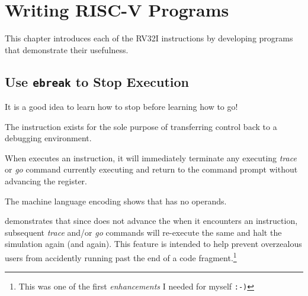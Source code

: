 \chapter{Writing RISC-V Programs}

%
This chapter introduces each of the RV32I instructions by developing programs 
that demonstrate their usefulness.


\section{Use {\tt ebreak} to Stop \rvddt{} Execution}
\label{insn:ebreak}

It is a good idea to learn how to stop before learning how to go!

The  instruction exists for the sole purpose of transferring control back 
to a debugging environment.\cite[p.~24]{rvismv1v22:2017}

When \rvddt{} executes an  instruction, it will immediately terminate any
executing {\em trace} or {\em go} command currently executing and return to the
command prompt without advancing the  register.  

The machine language encoding shows that  has no operands.


 demonstrates that since \rvddt{} does 
not advance the  when it encounters an  instruction, 
subsequent {\em trace} and/or {\em go} commands will re-execute the same  
and halt the simulation again (and again).  
This feature is intended to help prevent overzealous users from accidently 
running past the end of a code fragment.\footnote{This was one of the first {\em enhancements}
I needed for myself \tt:-)}




